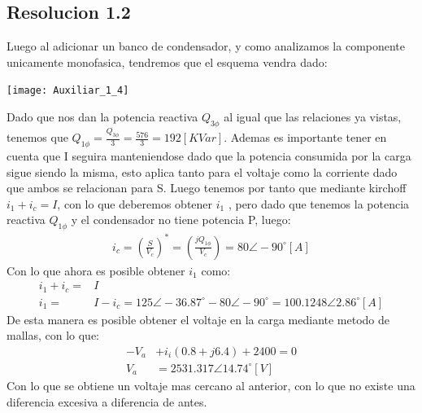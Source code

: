 \documentclass[
  11pt,
  letterpaper,
   addpoints,
   answers
  ]{exam}
\begin{document}
\begin{questions}
\begin{solution}
\subsection*{Resolucion 1.2}
Luego al adicionar un banco de condensador, y como analizamos la componente unicamente monofasica, tendremos que el esquema vendra dado:
\begin{center}
    \texttt{[image: Auxiliar\_1\_4]}
  \end{center}
Dado que nos dan la potencia reactiva $Q_{3\phi}$ al igual que las relaciones ya vistas, tenemos que $Q_{1\phi} = \frac{Q_{3\phi}}{3} =\frac{576}{3}= 192[KVar]$. Ademas es importante tener en cuenta que I seguira manteniendose dado que la potencia consumida por la carga sigue siendo la misma, esto aplica tanto para el voltaje como la corriente dado que ambos se relacionan para S. Luego tenemos por tanto que mediante kirchoff $i_{1}+i_{c} = I$, con lo que deberemos obtener $i_{1}$ , pero dado que tenemos la potencia reactiva $Q_{1\phi}$ y el condensador no tiene potencia P, luego:
\begin{align}
    i_{c} = \left(\frac{S}{V_{c}}\right)^{*} = \left( \frac{jQ_{1\phi}}{V_{c}}\right) = 80 \angle -90^{\circ} [A] 
\end{align}
Con lo que ahora es posible obtener $i_{1}$ como:
\begin{align}
    i_{1} + i_{c} =& I\\
    i_{1} =&  I- i_{c} = 125 \angle -36.87^{\circ} - 80\angle -90^{\circ} = 100.1248 \angle 2.86^{\circ} [A] 
\end{align}
De esta manera es posible obtener el voltaje en la carga mediante metodo de mallas, con lo que:
\begin{align}
    -V_{a} &+ i_{i}(0.8 + j6.4)+ 2400 = 0\\
    V_{a} &= 2531.317 \angle 14.74^{\circ} [V]
\end{align}
Con lo que se obtiene un voltaje mas cercano al anterior, con lo que no existe una diferencia excesiva a diferencia de antes.

\end{solution}
\end{questions}
\end{document}

